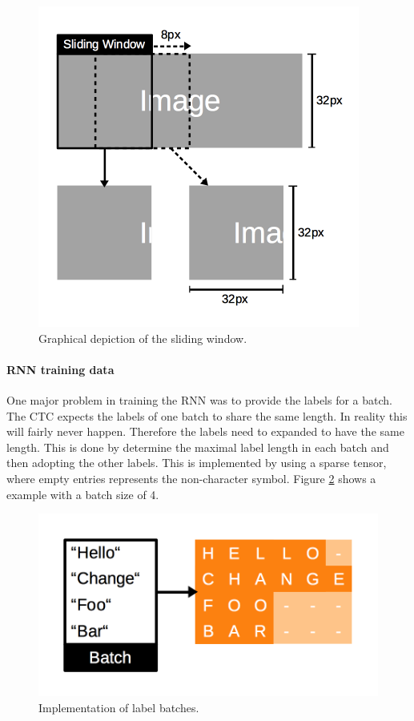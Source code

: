\documentclass{utue} %
\begin{document}
\begin{figure}[h!]
	\centering
	\includegraphics[width=\columnwidth]{graphics/model_sliding_window.png}
	\caption{\label{fig:sliding_window} Graphical depiction of the sliding window.}
\end{figure}


\paragraph{RNN training data}
One major problem in training the RNN was to provide the labels for a batch. The CTC expects the labels of one batch to share the same length. In reality this will fairly never happen. Therefore the labels need to expanded to have the same length. This is done by determine the maximal label length in each batch and then adopting the other labels. This is implemented by using a sparse tensor, where empty entries represents the non-character symbol. Figure \ref{fig:impl_rnn_labels} shows a example with a batch size of 4.

\begin{figure}[h!]
	\centering
	\includegraphics[width=.9\columnwidth]{graphics/impl_rnn_labels.png}
	\caption{\label{fig:impl_rnn_labels} Implementation of label batches.}
\end{figure}
\end{document}
